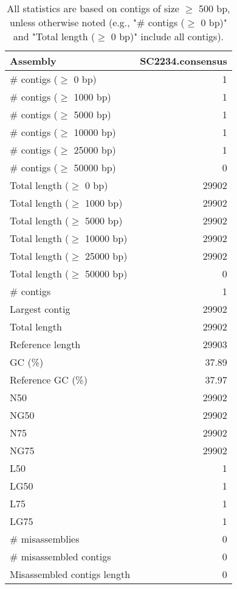 \documentclass[12pt,a4paper]{article}
\begin{document}
\begin{table}[ht]
\begin{center}
\caption{All statistics are based on contigs of size $\geq$ 500 bp, unless otherwise noted (e.g., "\# contigs ($\geq$ 0 bp)" and "Total length ($\geq$ 0 bp)" include all contigs).}
\begin{tabular}{|l*{1}{|r}|}
\hline
Assembly & SC2234.consensus \\ \hline
\# contigs ($\geq$ 0 bp) & 1 \\ \hline
\# contigs ($\geq$ 1000 bp) & 1 \\ \hline
\# contigs ($\geq$ 5000 bp) & 1 \\ \hline
\# contigs ($\geq$ 10000 bp) & 1 \\ \hline
\# contigs ($\geq$ 25000 bp) & 1 \\ \hline
\# contigs ($\geq$ 50000 bp) & 0 \\ \hline
Total length ($\geq$ 0 bp) & 29902 \\ \hline
Total length ($\geq$ 1000 bp) & 29902 \\ \hline
Total length ($\geq$ 5000 bp) & 29902 \\ \hline
Total length ($\geq$ 10000 bp) & 29902 \\ \hline
Total length ($\geq$ 25000 bp) & 29902 \\ \hline
Total length ($\geq$ 50000 bp) & 0 \\ \hline
\# contigs & 1 \\ \hline
Largest contig & 29902 \\ \hline
Total length & 29902 \\ \hline
Reference length & 29903 \\ \hline
GC (\%) & 37.89 \\ \hline
Reference GC (\%) & 37.97 \\ \hline
N50 & 29902 \\ \hline
NG50 & 29902 \\ \hline
N75 & 29902 \\ \hline
NG75 & 29902 \\ \hline
L50 & 1 \\ \hline
LG50 & 1 \\ \hline
L75 & 1 \\ \hline
LG75 & 1 \\ \hline
\# misassemblies & 0 \\ \hline
\# misassembled contigs & 0 \\ \hline
Misassembled contigs length & 0 \\ \hline

\end{tabular}
\end{center}
\end{table}
\end{document}
